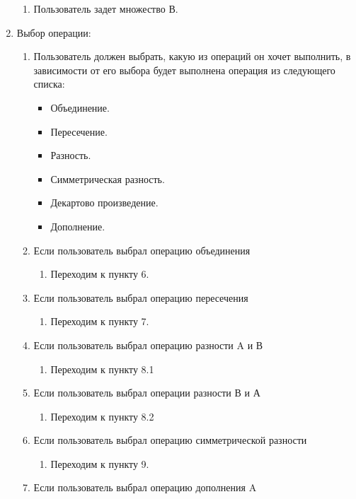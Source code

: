 \documentclass[a4paper,12pt]{extarticle}
\begin{document}
\begin{enumerate}
\begin{enumerate}[label*=\arabic*.]
    \item Пользователь задет множество В.
  \end{enumerate}
  \item Выбор операции:
  \begin{enumerate}[label*=\arabic*.]
    \item Пользователь должен выбрать, какую из операций он хочет выполнить, в зависимости от его выбора будет выполнена операция из следующего списка:
    \begin{itemize}
      \item Объединение.
      \item Пересечение.
      \item Разность.
      \item Симметрическая разность.
      \item Декартово произведение.
      \item Дополнение.
    \end{itemize}
    \item Если пользователь выбрал операцию объединения
    \begin{enumerate}[label*=\arabic*.]
      \item Переходим к пункту 6.
    \end{enumerate}
    \item Если пользователь выбрал операцию пересечения
    \begin{enumerate}[label*=\arabic*.]
      \item Переходим к пункту 7.
    \end{enumerate}
    \item Если пользователь выбрал операцию разности A и В
    \begin{enumerate}[label*=\arabic*.]
      \item Переходим к пункту 8.1
    \end{enumerate}
    \item Если пользователь выбрал операции разности В и А
    \begin{enumerate}[label*=\arabic*.]
      \item Переходим к пункту 8.2
    \end{enumerate}
    \item Если пользователь выбрал операцию симметрической разности
    \begin{enumerate}[label*=\arabic*.]
      \item Переходим к пункту 9.
    \end{enumerate}
    \item Если пользователь выбрал операцию дополнения A

\end{enumerate}
\end{enumerate}
\end{document}
